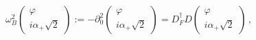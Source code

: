 \begin{equation}
\omega_B^2 
\left( \begin{array}{c} \varphi \\ {i\alpha_+}{\sqrt{2}} \end{array} \right)
:= -\partial_0^2
\left( \begin{array}{c} \varphi \\ {i\alpha_+}{\sqrt{2}} \end{array} \right)
= D_F^\dag D 
\left( \begin{array}{c} \varphi \\ {i\alpha_+}{\sqrt{2}} \end{array} \right)\,,
\label{omB}
\end{equation}

